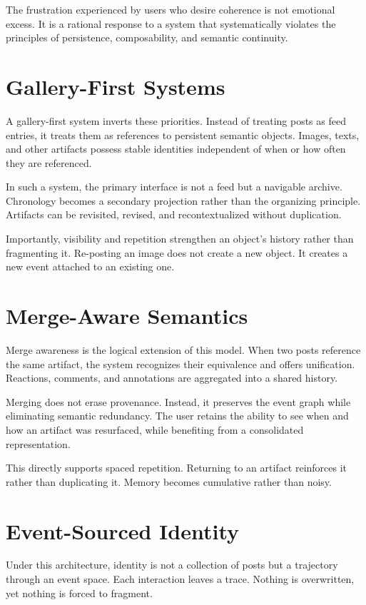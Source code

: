 \documentclass[11pt,oneside]{article}
\begin{document}
The frustration experienced by users who desire coherence is not emotional excess. It is a rational response to a system that systematically violates the principles of persistence, composability, and semantic continuity.

\section{Gallery-First Systems}

A gallery-first system inverts these priorities. Instead of treating posts as feed entries, it treats them as references to persistent semantic objects. Images, texts, and other artifacts possess stable identities independent of when or how often they are referenced.

In such a system, the primary interface is not a feed but a navigable archive. Chronology becomes a secondary projection rather than the organizing principle. Artifacts can be revisited, revised, and recontextualized without duplication.

Importantly, visibility and repetition strengthen an object’s history rather than fragmenting it. Re-posting an image does not create a new object. It creates a new event attached to an existing one.

\section{Merge-Aware Semantics}

Merge awareness is the logical extension of this model. When two posts reference the same artifact, the system recognizes their equivalence and offers unification. Reactions, comments, and annotations are aggregated into a shared history.

Merging does not erase provenance. Instead, it preserves the event graph while eliminating semantic redundancy. The user retains the ability to see when and how an artifact was resurfaced, while benefiting from a consolidated representation.

This directly supports spaced repetition. Returning to an artifact reinforces it rather than duplicating it. Memory becomes cumulative rather than noisy.

\section{Event-Sourced Identity}

Under this architecture, identity is not a collection of posts but a trajectory through an event space. Each interaction leaves a trace. Nothing is overwritten, yet nothing is forced to fragment.
\end{document}
